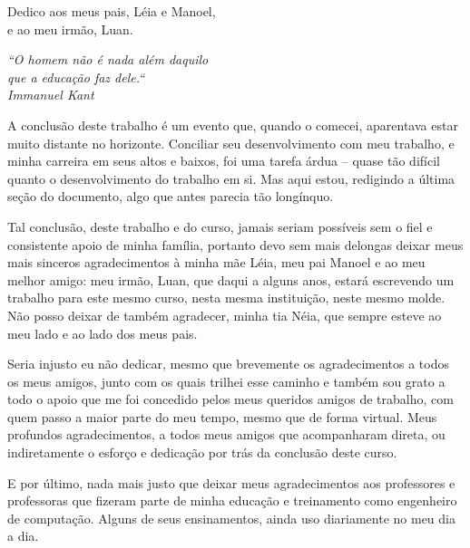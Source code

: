 \documentclass[
	11pt,
	openright,
	oneside,
	a4paper,
	english,
	french,
	spanish,
	brazil,	
	]{abntex2}
\newcommand{\quot}[1]{\begin{flushright} \textit{#1}\end{flushright}}
\begin{document}
\frenchspacing 

 \pretextual

\imprimircapa

\imprimirfolhaderosto*

\begin{dedicatoria}
    \vspace*{\fill}
	\begin{flushright}
		Dedico aos meus pais, Léia e Manoel,\\ e ao meu irmão, Luan.	
	\end{flushright}
\end{dedicatoria}

\begin{agradecimentos}

\quot{``O homem não é nada além daquilo\\que a educação faz dele.``\\Immanuel Kant}

A conclusão deste trabalho é um evento que, quando o comecei, aparentava estar muito distante no horizonte. Conciliar seu desenvolvimento com meu trabalho, e minha carreira em seus altos e baixos, foi uma tarefa árdua -- quase tão difícil quanto o desenvolvimento do trabalho em si. Mas aqui estou, redigindo a última seção do documento, algo que antes parecia tão longínquo.

Tal conclusão, deste trabalho e do curso, jamais seriam possíveis sem o fiel e consistente apoio de minha família, portanto devo sem mais delongas deixar meus mais sinceros agradecimentos à minha mãe Léia, meu pai Manoel e ao meu melhor amigo: meu irmão, Luan, que daqui a alguns anos, estará escrevendo um trabalho para este mesmo curso, nesta mesma instituição, neste mesmo molde. Não posso deixar de também agradecer, minha tia Néia, que sempre esteve ao meu lado e ao lado dos meus pais.

Seria injusto eu não dedicar, mesmo que brevemente os agradecimentos a todos os meus amigos, junto com os quais trilhei esse caminho e também sou grato a todo o apoio que me foi concedido pelos meus queridos amigos de trabalho, com quem passo a maior parte do meu tempo, mesmo que de forma virtual. Meus profundos agradecimentos, a todos meus amigos que acompanharam direta, ou indiretamente o esforço e dedicação por trás da conclusão deste curso.

E por último, nada mais justo que deixar meus agradecimentos aos professores e professoras que fizeram parte de minha educação e treinamento como engenheiro de computação. Alguns de seus ensinamentos, ainda uso diariamente no meu dia a dia.

\end{agradecimentos}
\end{document}
